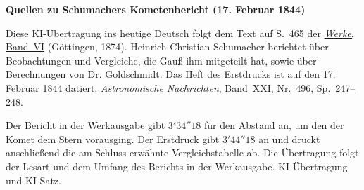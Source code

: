 \clearpage\thispagestyle{empty}
\begin{center}\textbf{Quellen zu Schumachers Kometenbericht (17. Februar 1844)}\end{center}
\noindent Diese KI-Übertragung ins heutige Deutsch folgt dem Text auf S.~465 der \href{https://gdz.sub.uni-goettingen.de/id/PPN236007467}{\textit{Werke}, Band~VI} (Göttingen, 1874). Heinrich Christian Schumacher berichtet über Beobachtungen und Vergleiche, die Gauß ihm mitgeteilt hat, sowie über Berechnungen von Dr. Goldschmidt. Das Heft des Erstdrucks ist auf den 17. Februar 1844 datiert. \textit{Astronomische Nachrichten}, Band~XXI, Nr.~496, \href{https://api.digitale-sammlungen.de/iiif/image/v2/bsb10049446_00132/full/1800,/0/default.jpg}{Sp.~247--248}.
\par\smallskip\noindent Der Bericht in der Werkausgabe gibt $3'34''18$ für den Abstand an, um den der Komet dem Stern vorausging. Der Erstdruck gibt $3'44''18$ an und druckt anschließend die am Schluss erwähnte Vergleichstabelle ab. Die Übertragung folgt der Lesart und dem Umfang des Berichts in der Werkausgabe. KI-Übertragung und KI-Satz.
\clearpage
